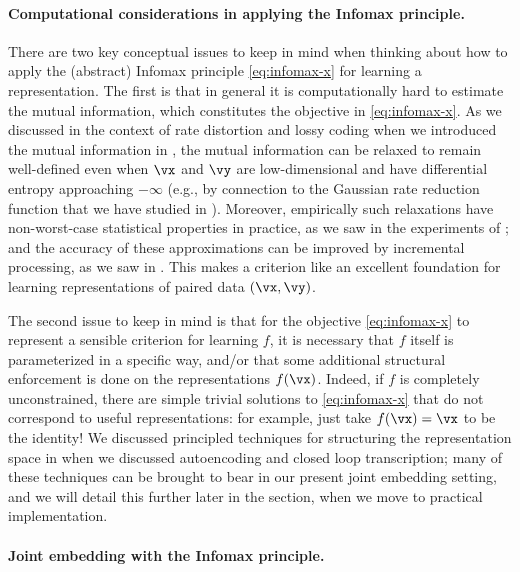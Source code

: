 \documentclass[../../book-main.tex]{subfiles}
\begin{document}
\paragraph{Computational considerations in applying the Infomax principle.}

There are two key conceptual issues to keep in mind when thinking about how to
apply the (abstract) Infomax principle \eqref{eq:infomax-x} for learning
a representation. The first is that in general it is computationally hard to
estimate the mutual information, which constitutes the objective in
\eqref{eq:infomax-x}.
As we discussed in the context of rate distortion and lossy coding
when we introduced
the mutual information in , the mutual information
can be relaxed to remain well-defined even when $\vx$ and $\vy$ are
low-dimensional and have differential entropy approaching $-\infty$ (e.g., by
    connection to the Gaussian rate reduction function that we have studied in
).
Moreover, empirically such relaxations have non-worst-case statistical
properties in practice, as we saw in the experiments of
; and the accuracy of these approximations can be
improved by incremental processing, as we saw in .
This makes a criterion like  an excellent foundation for
learning representations of paired data $(\vx, \vy)$.

The second issue to keep in mind is that for the objective \eqref{eq:infomax-x}
to represent a sensible criterion for learning $f$, it is necessary that $f$
itself is parameterized in a specific way, and/or that some additional
structural enforcement is done on the representations $f(\vx)$. Indeed, if $f$
is completely unconstrained, there are simple trivial solutions to
\eqref{eq:infomax-x} that do not correspond to useful representations: for
example, just take $f(\vx) = \vx$ to be the identity!
We discussed principled techniques for structuring the representation space in
 when we discussed autoencoding and closed
loop transcription; many of these techniques can be brought to bear in our
present joint embedding setting, and we will detail this further later in the
section, when we move to practical implementation.

\paragraph{Joint embedding with the Infomax principle.}
\end{document}
